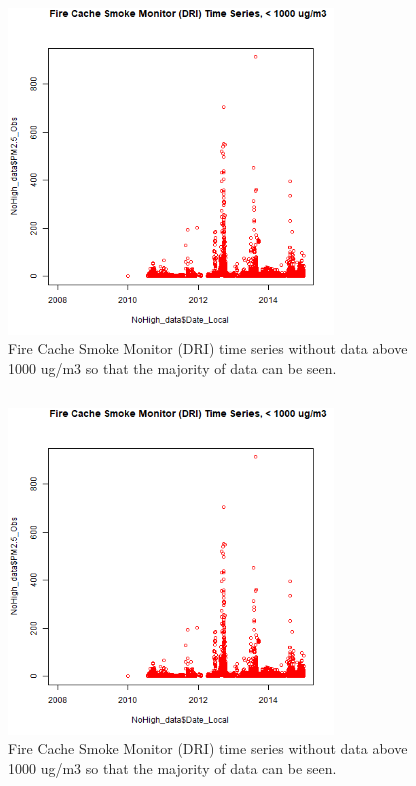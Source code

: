 \subsection{}
\begin{figure} 
\centering 
\includegraphics[width=0.77\textwidth]{Code_Outputs/FireCacheDRI_time_series_below_1000ugm3.png} 
\caption{\label{fig:FireCacheDRITSnoHigh}Fire Cache Smoke Monitor (DRI) time series without data above 1000 ug/m3 so that the majority of data can be seen.} 
\end{figure} 
 

\subsection{}
\begin{figure} 
\centering 
\includegraphics[width=0.77\textwidth]{Code_Outputs/FireCacheDRI_time_series_below_1000ugm3.png} 
\caption{\label{fig:FireCacheDRITSnoHigh}Fire Cache Smoke Monitor (DRI) time series without data above 1000 ug/m3 so that the majority of data can be seen.} 
\end{figure} 
 
